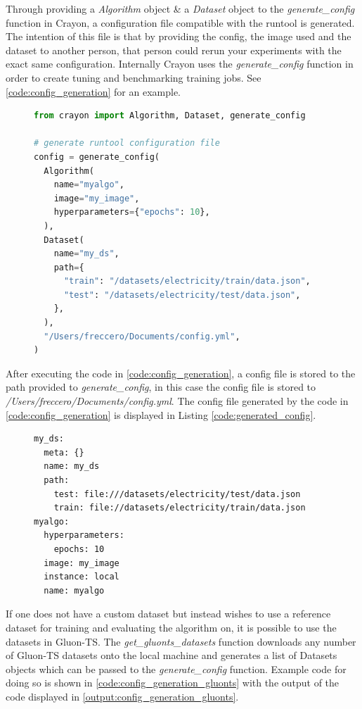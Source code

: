 Through providing a \textit{Algorithm} object \& a \textit{Dataset} object to the \textit{generate\_config} function in Crayon, a configuration file compatible with the runtool is generated. The intention of this file is that by providing the config, the image used and the dataset to another person, that person could rerun your experiments with the exact same configuration. Internally Crayon uses the \textit{generate\_config} function in order to create tuning and benchmarking training jobs. See \ref{code:config_generation} for an example.
\begin{figure}
  \begin{lstlisting}[language=Python, label={code:config_generation}, caption={Config generation using Crayon}]
from crayon import Algorithm, Dataset, generate_config

# generate runtool configuration file
config = generate_config(
  Algorithm(
    name="myalgo",
    image="my_image",
    hyperparameters={"epochs": 10},
  ),
  Dataset(
    name="my_ds",
    path={
      "train": "/datasets/electricity/train/data.json",
      "test": "/datasets/electricity/test/data.json",
    },
  ),
  "/Users/freccero/Documents/config.yml",
)
\end{lstlisting}
\end{figure}

After executing the code in \ref{code:config_generation}, a config file is stored to the path provided to \textit{generate\_config}, in this case the config file is stored to \textit{/Users/freccero/Documents/config.yml}. The config file generated by the code in \ref{code:config_generation} is displayed in Listing \ref{code:generated_config}.
\begin{figure}
  \begin{lstlisting}[label={code:generated_config}, caption={Generated configurations file.}]
my_ds:
  meta: {}
  name: my_ds
  path:
    test: file:///datasets/electricity/test/data.json
    train: file://datasets/electricity/train/data.json
myalgo:
  hyperparameters:
    epochs: 10
  image: my_image
  instance: local
  name: myalgo
\end{lstlisting}
\end{figure}


If one does not have a custom dataset but instead wishes to use a reference dataset for training and evaluating the algorithm on, it is possible to use the datasets in Gluon-TS. The \textit{get\_gluonts\_datasets} function downloads any number of Gluon-TS datasets onto the local machine and generates a list of Datasets objects which can be passed to the  \textit{generate\_config} function. Example code for doing so is shown in \ref{code:config_generation_gluonts} with the output of the code displayed in \ref{output:config_generation_gluonts}.

